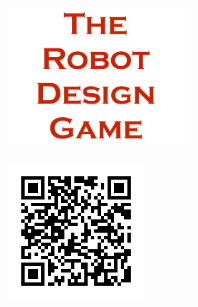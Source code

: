 \documentclass[11pt]{article}
\begin{document}
            
	
	\begin{center}
		\vfill
		\vfill
		\vfill

		\includegraphics[height=3.6cm]{rdg_logo}%
		
		\vfill

		\includegraphics[height=3.6cm]{bitterness-qr}%

		\vfill
	\end{center}
\end{document}
